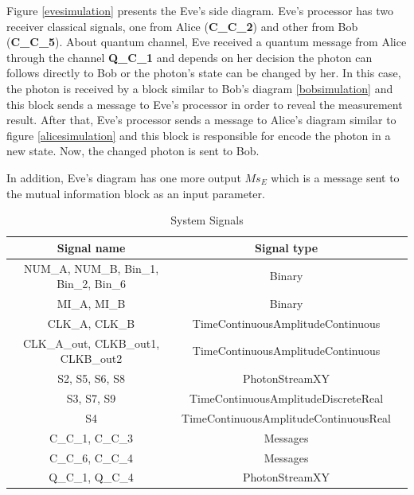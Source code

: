 Figure \ref{evesimulation} presents the Eve's side diagram. Eve's processor has two receiver classical signals, one from Alice (\textbf{C\_C\_2}) and other from Bob (\textbf{C\_C\_5}). About quantum channel, Eve received a quantum message from Alice through the channel \textbf{Q\_C\_1} and depends on her decision the photon can follows directly to Bob or the photon's state can be changed by her. In this case, the photon is received by a block similar to Bob's diagram \ref{bobsimulation} and this block sends a message to Eve's processor in order to reveal the measurement result. After that, Eve's processor sends a message to Alice's diagram similar to figure \ref{alicesimulation} and this block is responsible for encode the photon in a new state. Now, the changed photon is sent to Bob.

In addition, Eve's diagram has one more output $Ms_{E}$ which is a message sent to the mutual information block as an input parameter.

\begin{table}[H]
\centering
\caption{System Signals}
\label{tb:signals}
\begin{tabular}{|c|c|c|}
\hline
\textbf{Signal name}                        & \textbf{Signal type}                      \\ \hline
NUM\_A, NUM\_B, Bin\_1, Bin\_2, Bin\_6      &  Binary                                   \\ \hline
MI\_A, MI\_B                                &  Binary                                   \\ \hline
CLK\_A, CLK\_B                              &  TimeContinuousAmplitudeContinuous        \\ \hline
CLK\_A\_out, CLKB\_out1, CLKB\_out2         &  TimeContinuousAmplitudeContinuous        \\ \hline
S2, S5, S6, S8                              &  PhotonStreamXY                           \\ \hline
S3, S7, S9                                  &  TimeContinuousAmplitudeDiscreteReal      \\ \hline
S4                                          &  TimeContinuousAmplitudeContinuousReal      \\ \hline
C\_C\_1, C\_C\_3                            &  Messages                                 \\ \hline
C\_C\_6, C\_C\_4                            &  Messages                                 \\ \hline
Q\_C\_1, Q\_C\_4                            &  PhotonStreamXY                           \\ \hline

\end{tabular}
\end{table}


